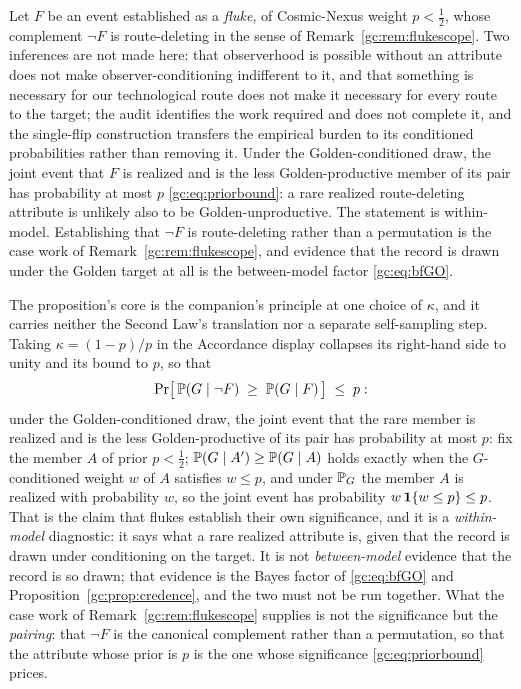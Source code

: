 \begin{proposition}
\label{gc:prop:flukes}
Let $F$ be an event established as a \emph{fluke}, of Cosmic-Nexus
weight $p<\tfrac12$, whose complement $\neg F$ is route-deleting in the
sense of Remark~\ref{gc:rem:flukescope}. Two inferences are not made here: that observerhood is possible without an attribute does not make observer-conditioning indifferent to it, and that something is necessary for our technological route does not make it necessary for every route to the target; the audit identifies the work required and does not complete it, and the single-flip construction transfers the empirical burden to its conditioned probabilities rather than removing it. Under the Golden-conditioned
draw, the joint event that $F$ is realized and is the less
Golden-productive member of its pair has probability at most $p$
\eqref{gc:eq:priorbound}: a rare realized route-deleting attribute is
unlikely also to be Golden-unproductive. The statement is within-model.
Establishing that $\neg F$ is route-deleting rather than a permutation
is the case work of Remark~\ref{gc:rem:flukescope}, and evidence that
the record is drawn under the Golden target at all is the between-model
factor \eqref{gc:eq:bfGO}.
\end{proposition}

\noindent The proposition's core is the companion's principle at one
choice of $\kappa$, and it carries neither the Second Law's
translation nor a separate self-sampling step. Taking
$\kappa=(1-p)/p$ in the Accordance display collapses its right-hand
side to unity and its bound to $p$, so that
\begin{equation}\label{gc:eq:priorbound}
\Pr\!\big[\,\mathbb{P}(G\mid\neg F)\;\ge\;\mathbb{P}(G\mid F)\,\big]\;\le\;p:
\end{equation}
under the Golden-conditioned draw, the joint event that the rare member
is realized and is the less Golden-productive of its pair has
probability at most $p$: fix the member $A$ of prior $p<\tfrac12$;
$\mathbb{P}(G\mid A')\ge\mathbb{P}(G\mid A)$ holds exactly when the $G$-conditioned
weight $w$ of $A$ satisfies $w\le p$, and under $\mathbb{P}_G$ the member $A$
is realized with probability $w$, so the joint event has probability
$w\,\mathbf{1}\{w\le p\}\le p$. That is the claim that flukes establish
their own significance, and it is a \emph{within-model} diagnostic: it
says what a rare realized attribute is, given that the record is drawn
under conditioning on the target. It is not \emph{between-model}
evidence that the record is so drawn; that evidence is the Bayes factor
of \eqref{gc:eq:bfGO} and Proposition~\ref{gc:prop:credence}, and the
two must not be run together. What the case work of
Remark~\ref{gc:rem:flukescope} supplies is not the significance but
the \emph{pairing}: that $\neg F$ is the canonical complement rather
than a permutation, so that the attribute whose prior is $p$ is the
one whose significance \eqref{gc:eq:priorbound} prices.

